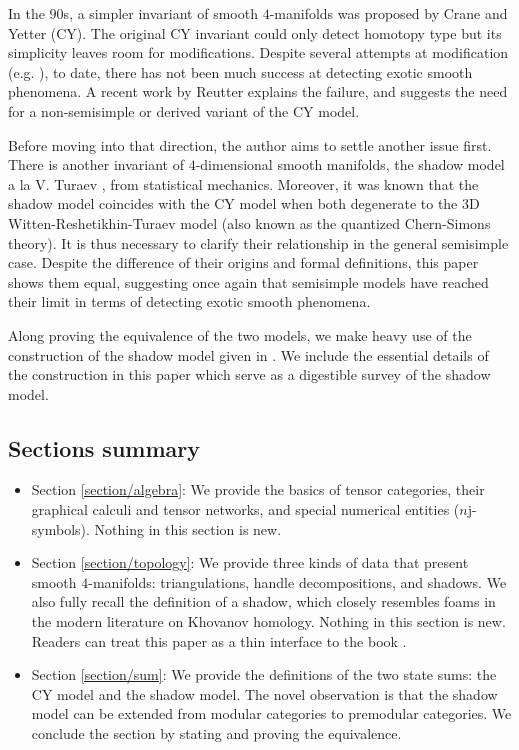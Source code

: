 \documentclass[12pt]{extarticle}
\numberwithin{equation}{section} %
\theoremstyle{mystyle}
\begin{document}
In the $90$s, a simpler invariant of smooth $4$-manifolds was
proposed by Crane and Yetter (CY). The original CY invariant
could only detect homotopy type but its simplicity leaves room
for modifications. Despite several attempts at modification (e.g.
\cite{barenz/evaluation-crane-yetter}), to date, there has not been
much success at detecting exotic smooth phenomena. A recent work
by Reutter \cite{reutter/semisimple} explains the failure, and
suggests the need for a non-semisimple or derived variant of the
CY model.

Before moving into that direction, the author aims to settle
another issue first. There is another invariant of
$4$-dimensional smooth manifolds, the shadow model a la V. Turaev
\cite{turaev/topology-of-shadows} \cite{turaev-qiok-3-manifolds},
from statistical mechanics. Moreover, it was known that the
shadow model coincides with the CY model when both degenerate
\cite[X.3.2 \& theorem X.3.3]{turaev-qiok-3-manifolds}
\cite{barrett/observables-in-tv-and-cy} to the $3$D
Witten-Reshetikhin-Turaev model (also known as the quantized
Chern-Simons theory). It is thus necessary to clarify their
relationship in the general semisimple case. Despite the
difference of their origins and formal definitions, this paper
shows them equal, suggesting once again that semisimple models
have reached their limit in terms of detecting exotic smooth
phenomena.

Along proving the equivalence of the two models, we make heavy
use of the construction of the shadow model given in
\cite{turaev-qiok-3-manifolds}. We include the essential details
of the construction in this paper which serve as a digestible
survey of the shadow model.

\subsection{Sections summary}

\begin{itemize}
  \item Section \ref{section/algebra}: We provide the basics of tensor
        categories, their graphical calculi and tensor networks,
        and special numerical entities ($n$j-symbols). Nothing in
        this section is new.
  \item Section \ref{section/topology}: We provide three kinds of
        data that present smooth $4$-manifolds: triangulations,
        handle decompositions, and shadows. We also fully recall
        the definition of a shadow, which closely resembles foams
        in the modern literature on Khovanov homology. Nothing in
        this section is new. Readers can treat this paper as a
        thin interface to the book
        \cite{turaev-qiok-3-manifolds}.
  \item Section \ref{section/sum}: We provide the definitions of
        the two state sums: the CY model and the shadow model.
        The novel observation is that the shadow model can be
        extended from modular categories to premodular
        categories. We conclude the section by stating and
        proving the equivalence.
\end{itemize}
\end{document}
